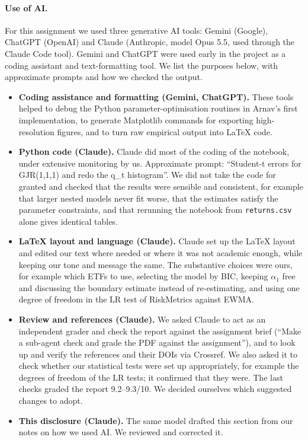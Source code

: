 \documentclass[10pt,a4paper]{article}
\begin{document}
\paragraph{Use of AI.} For this assignment we used three generative AI tools: Gemini (Google), ChatGPT (OpenAI) and Claude (Anthropic, model Opus 5.5, used through the Claude Code tool). Gemini and ChatGPT were used early in the project as a coding assistant and text-formatting tool. We list the purposes below, with approximate prompts and how we checked the output.
\begin{itemize}
  \item \textbf{Coding assistance and formatting (Gemini, ChatGPT).} These tools helped to debug the Python parameter-optimisation routines in Arnav's first implementation, to generate Matplotlib commands for exporting high-resolution figures, and to turn raw empirical output into LaTeX code.
  \item \textbf{Python code (Claude).} Claude did most of the coding of the notebook, under extensive monitoring by us. Approximate prompt: ``Student-t errors for GJR(1,1,1) and redo the q\_t histogram''. We did not take the code for granted and checked that the results were sensible and consistent, for example that larger nested models never fit worse, that the estimates satisfy the parameter constraints, and that rerunning the notebook from \texttt{returns.csv} alone gives identical tables.
  \item \textbf{LaTeX layout and language (Claude).} Claude set up the LaTeX layout and edited our text where needed or where it was not academic enough, while keeping our tone and message the same. The substantive choices were ours, for example which ETFs to use, selecting the model by BIC, keeping $\alpha_1$ free and discussing the boundary estimate instead of re-estimating, and using one degree of freedom in the LR test of RiskMetrics against EWMA.
  \item \textbf{Review and references (Claude).} We asked Claude to act as an independent grader and check the report against the assignment brief (``Make a sub-agent check and grade the PDF against the assignment''), and to look up and verify the references and their DOIs via Crossref. We also asked it to check whether our statistical tests were set up appropriately, for example the degrees of freedom of the LR tests; it confirmed that they were. The last checks graded the report 9.2--9.3/10. We decided ourselves which suggested changes to adopt.
  \item \textbf{This disclosure (Claude).} The same model drafted this section from our notes on how we used AI. We reviewed and corrected it.
\end{itemize}
\end{document}
